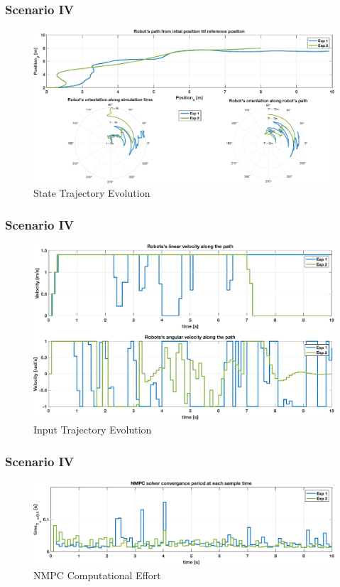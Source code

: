 	\begin{frame}
		\frametitle{Scenario IV}
		\begin{figure}[hbtp]
			\centering
			\includegraphics[scale=0.44]{pictures/graphs/sn3_states.eps}
			\caption{State Trajectory Evolution}
		\end{figure}
	\end{frame}
	
	\begin{frame}
		\frametitle{Scenario IV}
		\begin{figure}[hbtp]
			\centering
			\includegraphics[scale=0.42]{pictures/graphs/sn3_inputs.eps}
			\caption{Input Trajectory Evolution}
		\end{figure}
	\end{frame}
	
	\begin{frame}
		\frametitle{Scenario IV}
		\begin{figure}[hbtp]
			\centering
			\includegraphics[scale=0.42]{pictures/graphs/sn3_solver_time.eps}
			\caption{NMPC Computational Effort}
		\end{figure}
	\end{frame}

